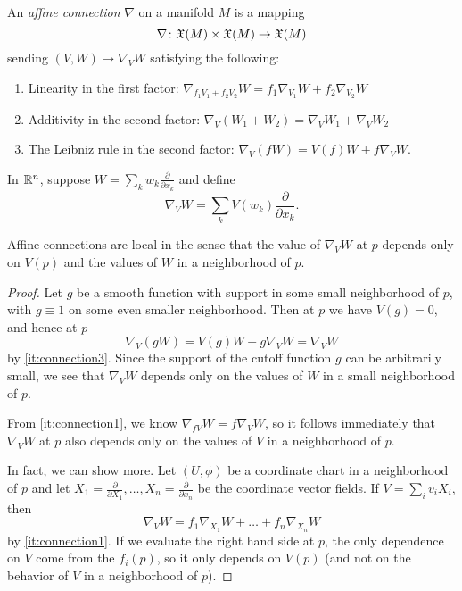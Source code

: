 \begin{definition}\label{def:affine connection}
	An \emph{affine connection} $\nabla$ on a manifold $M$ is a mapping
	\[
		\nabla \colon\thinspace\! \mathfrak{X}(M) \times \mathfrak{X}(M) \to \mathfrak{X}(M)
	\]
	sending $(V,W) \mapsto \nabla_V W$ satisfying the following:
	\begin{enumerate}
		\item \label{it:connection1} Linearity in the first factor: $\nabla_{f_1V_1 + f_2 V_2} W = f_1 \nabla_{V_1}W + f_2 \nabla_{V_2}W$
		\item \label{it:connection2} Additivity in the second factor: $\nabla_V(W_1 + W_2) = \nabla_V W_1 + \nabla_V W_2$
		\item \label{it:connection3} The Leibniz rule in the second factor: $\nabla_V(f W) = V(f) W + f \nabla_V W$.
	\end{enumerate}
\end{definition}

\begin{example}\label{ex:euclidean connection}
	In $\mathbb{R}^n$, suppose $W = \sum_k w_k \frac{\partial}{\partial x_k}$ and define
	\[
		\nabla_V W = \sum_k V(w_k) \frac{\partial}{\partial x_k}.
	\]
\end{example}

\begin{lemma}\label{lem:connection is local}
	Affine connections are local in the sense that the value of $\nabla_V W$ at $p$ depends only on $V(p)$ and the values of $W$ in a neighborhood of $p$.
\end{lemma}

\begin{proof}
	Let $g$ be a smooth function with support in some small neighborhood of $p$, with $g \equiv 1$ on some even smaller neighborhood. Then at $p$ we have $V(g) = 0$, and hence at $p$
	\[
		\nabla_V (g W) = V(g) W + g \nabla_V W = \nabla_V W
	\]
	by \ref{it:connection3}. Since the support of the cutoff function $g$ can be arbitrarily small, we see that $\nabla_V W$ depends only on the values of $W$ in a small neighborhood of $p$.
	
	From \ref{it:connection1}, we know $\nabla_{fV}W = f \nabla_V W$, so it follows immediately that $\nabla_V W$ at $p$ also depends only on the values of $V$ in a neighborhood of $p$.
	
	In fact, we can show more. Let $(U,\phi)$ be a coordinate chart in a neighborhood of $p$ and let $X_1 = \frac{\partial}{\partial X_1}, \dots , X_n = \frac{\partial}{\partial x_n}$ be the coordinate vector fields. If $V = \sum_i v_i X_i$, then
	\[
		\nabla_V W = f_1 \nabla_{X_1} W + \dots + f_n \nabla_{X_n}W
	\]
	by \ref{it:connection1}. If we evaluate the right hand side at $p$, the only dependence on $V$ come from the $f_i(p)$, so it only depends on $V(p)$ (and not on the behavior of $V$ in a neighborhood of $p$).
\end{proof}

